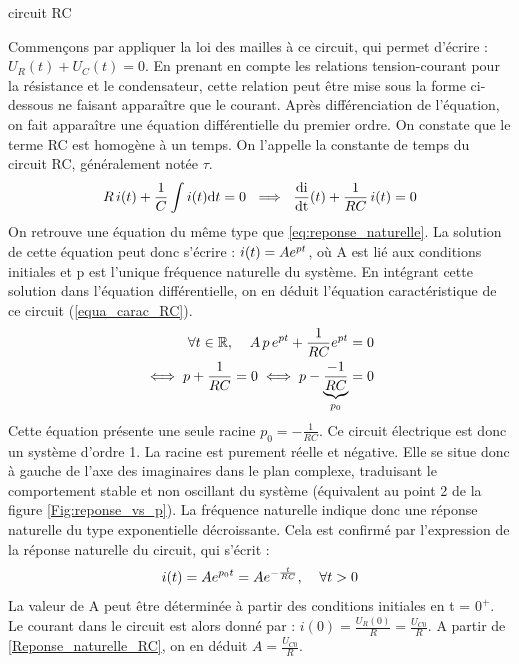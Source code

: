 \begin{remark}{}
\begin{exemple}{circuit RC}
          
          Commençons par appliquer la loi des mailles à ce circuit, qui
          permet d'écrire : $U_{R}(t)+U_{C}(t)=0.$ En prenant en compte
          les relations tension-courant pour la résistance et le
          condensateur, cette relation peut être mise sous la forme
          ci-dessous ne faisant apparaître que le courant. Après
          différenciation de l'équation, on fait apparaître une équation
          différentielle du premier ordre. On constate que le terme RC
          est homogène à un temps. On l'appelle la constante de temps du
          circuit RC, généralement notée $\tau$.
          \begin{equation*}
            R\,i(t)+\frac{1}{C}\int i(t) \mathrm{d{}} t=0~\implies ~\frac{\mathrm{d{i}}}{\mathrm{d{t}}}(t)+\frac{1}{RC}\,i(t) = 0
          \end{equation*}
          On retrouve une équation du même type que
          \ref{eq:reponse_naturelle}. La solution de cette
          équation peut donc s'écrire : $i(t) = Ae^{pt}$, où A est lié
          aux conditions initiales et p est l'unique fréquence naturelle
          du système. En intégrant cette solution dans l'équation
          différentielle, on en déduit l'équation caractéristique de ce
          circuit (\ref{equa_carac_RC}).
          \begin{eqnarray*}
            \label{equa_carac_RC}
            \forall t\in\mathbb{R},\;\;\;\; A\,p\,e^{pt}+\frac{1}{RC} e^{pt}=0 \nonumber\\
            \iff p+\frac{1}{RC}=0 \iff p-\underbrace{\frac{-1}{RC}}_{p_{0}}=0
          \end{eqnarray*}
          Cette équation présente une seule racine $p_{0} =
          -\frac{1}{RC}$. Ce circuit électrique est donc un système
          d'ordre 1. La racine est purement réelle et négative. Elle se
          situe donc à gauche de l'axe des imaginaires dans le plan complexe,
          traduisant le comportement stable et non oscillant du système
          (équivalent au point 2 de la figure
          \ref{Fig:reponse_vs_p}). La fréquence naturelle indique donc
          une réponse naturelle du type exponentielle décroissante. Cela
          est confirmé par l'expression de la réponse naturelle du
          circuit, qui s'écrit :
          \begin{equation}\label{Reponse_naturelle_RC}
            i(t)=Ae^{p_{0}t}=Ae^{-\frac{t}{RC}},\;\;\;\; \forall t>0
          \end{equation}
          La valeur de A peut être déterminée à partir des conditions
          initiales en t = $0^{+}$. Le courant dans le circuit est alors
          donné par : $i(0)=\frac{U_{R}(0)}{R}=\frac{U_{C0}}{R}$. A
          partir de \ref{Reponse_naturelle_RC}, on en déduit
          $A=\frac{U_{C0}}{R}$.
        \end{exemple}
        

\end{remark}
